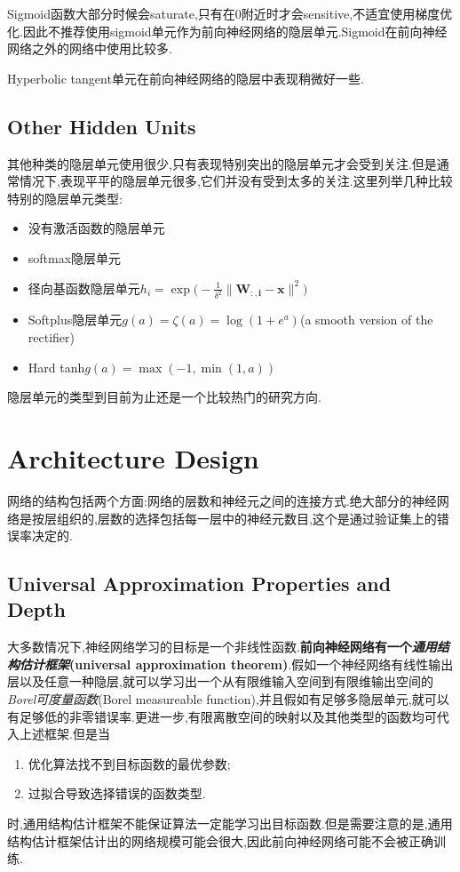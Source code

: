 Sigmoid函数大部分时候会saturate,只有在$0$附近时才会sensitive,不适宜使用梯度优化.因此不推荐使用sigmoid单元作为前向神经网络的隐层单元.Sigmoid在前向神经网络之外的网络中使用比较多.

Hyperbolic tangent单元在前向神经网络的隐层中表现稍微好一些.

\subsection{Other Hidden Units}

其他种类的隐层单元使用很少,只有表现特别突出的隐层单元才会受到关注.但是通常情况下,表现平平的隐层单元很多,它们并没有受到太多的关注.这里列举几种比较特别的隐层单元类型:
\begin{itemize}
    \item 没有激活函数的隐层单元
    \item softmax隐层单元
    \item 径向基函数隐层单元$h_i=\exp\Big(-\frac{1}{\delta^2}\|\mathbf{W_{:,i}-x}\|^2\Big)$
    \item Softplus隐层单元$g(a)=\zeta(a)=\log(1+e^a)$(a smooth version of the rectifier)
    \item Hard tanh$g(a)=\max(-1,\min(1,a))$
\end{itemize}

隐层单元的类型到目前为止还是一个比较热门的研究方向.

\section{Architecture Design}

网络的结构包括两个方面:网络的层数和神经元之间的连接方式.绝大部分的神经网络是按层组织的,层数的选择包括每一层中的神经元数目,这个是通过验证集上的错误率决定的.

\subsection{Universal Approximation Properties and Depth}

大多数情况下,神经网络学习的目标是一个非线性函数.\textbf{前向神经网络有一个\textit{通用结构估计框架}(universal approximation theorem)}.假如一个神经网络有线性输出层以及任意一种隐层,就可以学习出一个从有限维输入空间到有限维输出空间的\textit{Borel可度量函数}(Borel measureable function),并且假如有足够多隐层单元,就可以有足够低的非零错误率.更进一步,有限离散空间的映射以及其他类型的函数均可代入上述框架.但是当
\begin{enumerate}
\item 优化算法找不到目标函数的最优参数;
\item 过拟合导致选择错误的函数类型.
\end{enumerate}
时,通用结构估计框架不能保证算法一定能学习出目标函数.但是需要注意的是,通用结构估计框架估计出的网络规模可能会很大,因此前向神经网络可能不会被正确训练.


